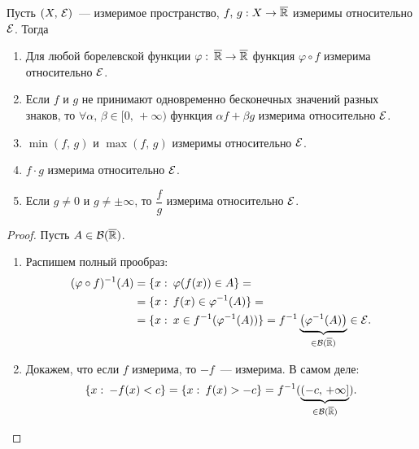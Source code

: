 \begin{claim}
    Пусть $(X,\, \mathcal{E})$~--- измеримое пространство, $f,\, g: X\to\overline{\mathbb{R}}$ измеримы относительно $\mathcal{E}$. Тогда
    \begin{enumerate}
        \item Для любой борелевской функции $\varphi:\:\overline{\mathbb{R}}\to\overline{\mathbb{R}}$ функция $\varphi\circ f$ измерима относительно $\mathcal{E}$.
        \item Если $f$ и $g$ не принимают одновременно бесконечных значений разных знаков, то
              $\forall \alpha,\, \beta\in [0,\, +\infty)$ функция $\alpha f+\beta g$ измерима относительно $\mathcal{E}$.
        \item $\min(f,\, g)$ и $\max(f,\, g)$ измеримы относительно $\mathcal{E}$.
        \item $f\cdot g$ измерима относительно $\mathcal{E}$.
        \item Если $g\neq 0$ и $g\neq\pm\infty$, то $\dfrac{f}{g}$ измерима относительно $\mathcal{E}$.
    \end{enumerate}

    \begin{proof}

        Пусть $A\in\mathcal{B}(\overline{\mathbb{R}})$.

        \begin{enumerate}
            \item Распишем полный прообраз:
                  \begin{align*}
                      (\varphi\circ f)^{-1}(A) & =\{x:\: \varphi(f(x))\in A\}=                                                                               \\
                                               & =\{x:\: f(x)\in\varphi^{-1}(A)\}=                                                                           \\
                                               & =\{x:\: x\in f^{-1}(\varphi^{-1}(A))\}=f^{-1}\underbrace{\left(\varphi^{-1}(A)\right)}_{\in\mathcal{B}(\overline{\mathbb{R}})}\in\mathcal{E}. \\
                  \end{align*}
            \item Докажем, что если $f$ измерима, то $-f$~--- измерима. В самом деле:
                  \[
                      \{x:\: -f(x)<c\}=\{x:\: f(x)>-c\}=f^{-1}(\underbrace{(-c,\, +\infty]}_{\in\mathcal{B}(\overline{\mathbb{R}})}).
                  \]
        \end{enumerate}

    \end{proof}
\end{claim}